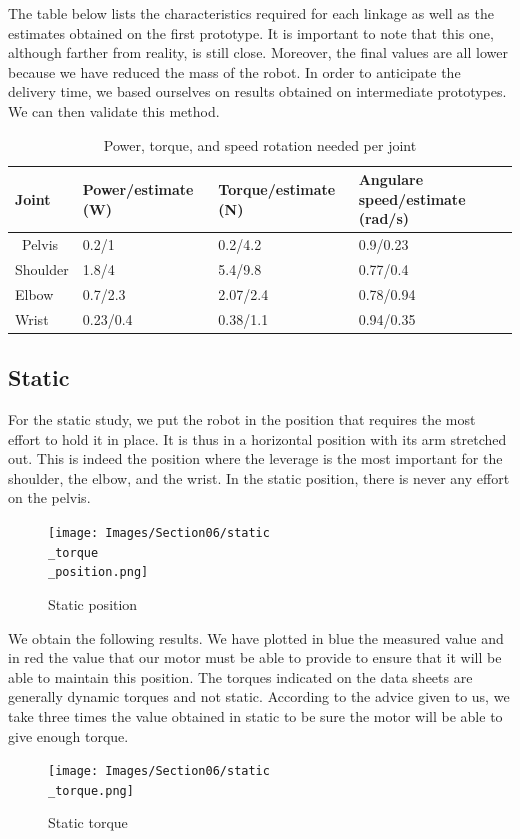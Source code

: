 \bigbreak
The table below lists the characteristics required for each linkage as well as the estimates obtained on the first prototype. It is important to note that this one, although farther from reality, is still close. Moreover, the final values are all lower because we have reduced the mass of the robot. In order to anticipate the delivery time, we based ourselves on results obtained on intermediate prototypes. We can then validate this method. 

\begin{table}[ht]
    \centering
    \begin{tabular}{|p{1.5cm} | p{4cm} | p{4cm}|p{5cm} |} 
        \hline
        \textbf{Joint} & \textbf{Power/estimate (W)} & \textbf{Torque/estimate (N)}& \textbf{Angulare speed/estimate (rad/s)}\\ [0.3ex] 
        \hline\
        Pelvis & 0.2/1 & 0.2/4.2 & 0.9/0.23 \\ 
        \hline
        Shoulder & 1.8/4 & 5.4/9.8 & 0.77/0.4 \\ 
        \hline
        Elbow & 0.7/2.3 & 2.07/2.4 & 0.78/0.94 \\ 
        \hline
        Wrist & 0.23/0.4 & 0.38/1.1 & 0.94/0.35 \\ 
        \hline
    \end{tabular}
    \caption{Power, torque, and speed rotation needed per joint}
\end{table}
\FloatBarrier

\subsection{Static}

For the static study, we put the robot in the position that requires the most effort to hold it in place. It is thus in a horizontal position with its arm stretched out. This is indeed the position where the leverage is the most important for the shoulder, the elbow, and the wrist. In the static position, there is never any effort on the pelvis.
\begin{figure}[ht]
    \centering
    \texttt{[image: Images/Section06/static\\\_torque\\\_position.png]}
    \caption{Static position}
    \label{fig:StaticPosition}
\end{figure}
\FloatBarrier

\bigbreak
We obtain the following results. We have plotted in blue the measured value and in red the value that our motor must be able to provide to ensure that it will be able to maintain this position. The torques indicated on the data sheets are generally dynamic torques and not static. According to the advice given to us, we take three times the value obtained in static to be sure the motor will be able to give enough torque.
\begin{figure}[ht]
    \centering
    \texttt{[image: Images/Section06/static\\\_torque.png]}
    \caption{Static torque}
    \label{fig:StaticTorque}
\end{figure}
\FloatBarrier

